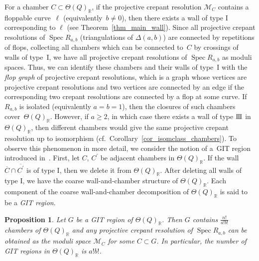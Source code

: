\documentclass[pdftex]{sigma}
\numberwithin{equation}{section}
\newtheorem{Proposition}[Theorem]{Proposition}
\theoremstyle{definition}
\newcommand{\RR}{\mathbb{R}}
\newcommand{\calM}{\mathcal{M}}
\newcommand{\Spec}{\operatorname{Spec}}
\newcommand{\typeIII}{{\rm I\hspace{-0.7pt}I\hspace{-0.7pt}I}}
\begin{document}
For a chamber $C\subset \Theta(Q)_\RR$, if the projective crepant resolution $\calM_C$ contains a floppable curve~$\ell$ (equivalently~$b\neq 0$),
then there exists a wall of type I corresponding to $\ell$ (see Theorem~\ref{thm_main_wall}).
Since all projective crepant resolutions of $\Spec R_{a,b}$ (triangulations of $\Delta(a,b)$) are connected by repetitions of flops,
collecting all chambers which can be connected to~$C$ by crossings of walls of type~I, we have all projective crepant resolutions of $\Spec R_{a,b}$
as moduli spaces.
Thus, we can identify these chambers and their walls of type~I with the \emph{flop graph} of projective crepant resolutions,
which is a graph whose vertices are projective crepant resolutions and two vertices are connected by an edge if the corresponding two crepant resolutions are connected by a flop at some curve.
If $R_{a,b}$ is isolated (equivalently $a=b=1$), then the closures of such chambers cover~$\Theta(Q)_\RR$.
However, if $a\ge 2$, in which case there exists a wall of type $\typeIII$ in $\Theta(Q)_\RR$, then different chambers would give the same
projective crepant resolution up to isomorphism (cf.\ Corollary~\ref{cor_isomclass_chambers}).
To observe this phenomenon in more detail, we consider the notion of a~GIT region introduced in~\cite{BCS_GIT}.
First, let $C$, $C^\prime$ be adjacent chambers in $\Theta(Q)_\RR$.
If the wall $\overline{C}\cap\overline{C^\prime}$ is of type I, then we delete it from $\Theta(Q)_\RR$.
After deleting all walls of type I, we have the coarse wall-and-chamber structure of $\Theta(Q)_\RR$.
Each component of the coarse wall-and-chamber decomposition of $\Theta(Q)_\RR$ is said to be a \emph{GIT region}.

\begin{Proposition}\label{prop_numberx_gallery}
Let $G$ be a GIT region of $\Theta(Q)_\RR$. Then $G$ contains $\frac{n!}{a!b!}$ chambers of $\Theta(Q)_\RR$ and
any projective crepant resolution of $\Spec R_{a,b}$ can be obtained as the moduli space $\calM_C$ for some $C\subset G$.
In particular, the number of GIT regions in $\Theta(Q)_\RR$ is $a! b!$.
\end{Proposition}
\end{document}
